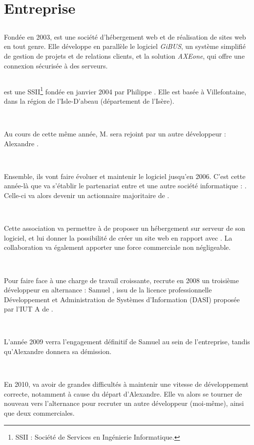 \chapter{Entreprise}
\section{\fidit}
Fondée en 2003, \fidit{} est une société d'hébergement web et de réalisation de sites web en tout genre. Elle développe en parallèle le logiciel \emph{GiBUS}, un système simplifié de gestion de projets et de relations clients, et la solution \emph{AXEone}, qui offre une connexion sécurisée à des serveurs.

\section{\solulog}
\solulog{} est une SSII\footnote{SSII : Société de Services en Ingénierie Informatique.} fondée en janvier 2004 par Philippe . Elle est basée à Villefontaine, dans la région de l'Isle-D'abeau (département de l'Isère).

~

Au cours de cette même année, M.  sera rejoint par un autre développeur : Alexandre .
		
~		
		
Ensemble, ils vont faire évoluer et maintenir le logiciel \integrale{} jusqu'en 2006. C'est cette année-là que va s'établir le partenariat entre \solulog{} et une autre société informatique : \fidit. Celle-ci va alors devenir un actionnaire majoritaire de \solulog.

~
	
Cette association va permettre à \solulog{} de proposer un hébergement sur serveur de son logiciel, et lui donner la possibilité de créer un site web en rapport avec \integrale. La collaboration va également apporter une force commerciale non négligeable.
	
~
	
Pour faire face à une charge de travail croissante, \solulog{} recrute en 2008 un troisième développeur en alternance : Samuel , issu de la licence professionnelle Développement et Administration de Systèmes d'Information (DASI) proposée par l'IUT A de .
	
~	
	
L'année 2009 verra l'engagement définitif de Samuel au sein de l'entreprise, tandis qu'Alexandre donnera sa démission.
	
~
	
En 2010, \solulog{} va avoir de grandes difficultés à maintenir une vitesse de développement correcte, notamment à cause du départ d'Alexandre. Elle va alors se tourner de nouveau vers l'alternance pour recruter un autre développeur (moi-même), ainsi que deux commerciales.